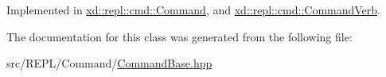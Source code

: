 Implemented in \mbox{\hyperlink{classxd_1_1repl_1_1cmd_1_1_command_ae10301038c77c9226c6bb6c7c0ad85c8}{xd\+::repl\+::cmd\+::\+Command}}, and \mbox{\hyperlink{classxd_1_1repl_1_1cmd_1_1_command_verb_a63744f7758a04b9752e70d6b7e2697a8}{xd\+::repl\+::cmd\+::\+Command\+Verb}}.



The documentation for this class was generated from the following file\+:\begin{DoxyCompactItemize}
\item 
src/\+R\+E\+P\+L/\+Command/\mbox{\hyperlink{_command_base_8hpp}{Command\+Base.\+hpp}}\end{DoxyCompactItemize}
